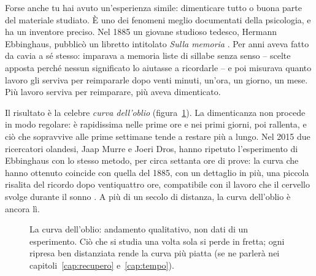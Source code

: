 Forse anche tu hai avuto un'esperienza simile: dimenticare tutto o buona parte del materiale studiato. È uno dei fenomeni meglio documentati della
psicologia, e ha un inventore preciso. Nel 1885 un giovane studioso
tedesco, Hermann Ebbinghaus, pubblicò un libretto intitolato \emph{Sulla
memoria} \parencite{ebbinghaus1885}. Per anni aveva fatto da cavia a sé
stesso: imparava a memoria liste di sillabe senza senso -- scelte
apposta perché nessun significato lo aiutasse a ricordarle -- e poi
misurava quanto lavoro gli serviva per reimpararle dopo venti minuti,
un'ora, un giorno, un mese. Più lavoro serviva per reimparare, più
aveva dimenticato.

Il risultato è la celebre \emph{curva dell'oblio}
(figura~\ref{fig:oblio}). La dimenticanza non procede in modo regolare:
è rapidissima nelle prime ore e nei primi giorni, poi rallenta, e ciò
che sopravvive alle prime settimane tende a restare più a lungo. Nel
2015 due ricercatori olandesi, Jaap Murre e Joeri Dros, hanno ripetuto
l'esperimento di Ebbinghaus con lo stesso metodo, per circa settanta ore
di prove: la curva che hanno ottenuto coincide con quella del 1885, con
un dettaglio in più, una piccola risalita del ricordo dopo ventiquattro
ore, compatibile con il lavoro che il cervello svolge durante il sonno
\parencite{murre2015}. A più di un secolo di distanza, la curva
dell'oblio è ancora lì.

\begin{figure}[tbp]
  \centering
  \caption{La curva dell'oblio: andamento qualitativo, non dati di un
    esperimento. Ciò che si studia una volta sola si perde in fretta;
    ogni ripresa ben distanziata rende la curva più piatta (se ne
    parlerà nei capitoli~\ref{cap:recupero} e~\ref{cap:tempo}).}
  \label{fig:oblio}
\end{figure}

